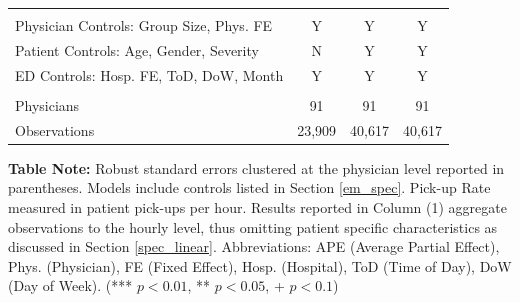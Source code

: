 \begin{table}[htbp]
{\begin{threeparttable}[t]
\begin{tabular}{lcccc}
          &       &       &       &  \\
    Physician Controls: Group Size, Phys. FE & Y     & \multicolumn{2}{c}{Y} & Y \\
    Patient Controls: Age, Gender, Severity & N     & \multicolumn{2}{c}{Y} & Y \\
    ED Controls: Hosp. FE, ToD, DoW, Month & Y     & \multicolumn{2}{c}{Y} & Y \\
          &       &       &       &  \\
    Physicians & 91    & \multicolumn{2}{c}{91} & 91 \\
    Observations & 23,909 & \multicolumn{2}{c}{40,617} &  40,617  \\
    \end{tabular}%
    \medskip
    \begin{tablenotes}
      \footnotesize
      \item \textbf{Table Note:} Robust standard errors clustered at the physician level reported in parentheses. Models include controls listed in Section \ref{em_spec}. Pick-up Rate measured in patient pick-ups per hour. Results reported in Column (1) aggregate observations to the hourly level, thus omitting patient specific characteristics as discussed in Section \ref{spec_linear}. Abbreviations: APE (Average Partial Effect), Phys. (Physician), FE (Fixed Effect), Hosp. (Hospital), ToD (Time of Day), DoW (Day of Week). (*** $p < 0.01$, ** $p < 0.05$, + $p < 0.1$)
    \end{tablenotes}
  \label{tab:pu_H1H2}
  \end{threeparttable} }
 \end{table}
 
